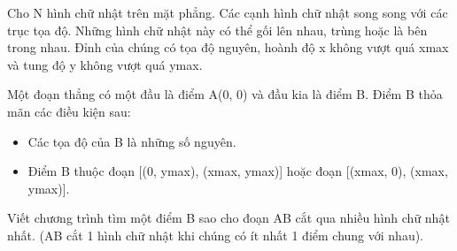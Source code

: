 Cho N hình chữ nhật trên mặt phẳng. Các cạnh hình chữ nhật song song với các trục tọa độ. Những hình chữ nhật này có thể gối lên nhau, trùng hoặc là bên trong nhau. Đỉnh của chúng có tọa độ nguyên, hoành độ x không vượt quá xmax và tung độ y không vượt quá ymax.


Một đoạn thẳng có một đầu là điểm A(0, 0) và đầu kia là điểm B. Điểm B thỏa mãn các điều kiện sau:
\begin{itemize}
	\item Các tọa độ của B là những số nguyên.
	\item Điểm B thuộc đoạn [(0, ymax), (xmax, ymax)] hoặc đoạn [(xmax, 0), (xmax, ymax)].
\end{itemize}

Viết chương trình tìm một điểm B sao cho đoạn AB cắt qua nhiều hình chữ nhật nhất. (AB cắt 1 hình chữ nhật khi chúng có ít nhất 1 điểm chung với nhau).